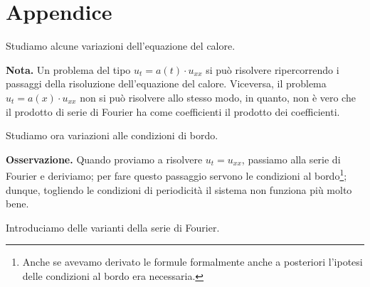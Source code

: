 \section{Appendice}

Studiamo alcune variazioni dell'equazione del calore.

\textbf{Nota.} Un problema del tipo $u_t = a(t) \cdot u_{xx}$ si può risolvere ripercorrendo i passaggi della risoluzione dell'equazione del calore.
Viceversa, il problema $u_t = a(x) \cdot u_{xx}$ non si può risolvere allo stesso modo, in quanto, non è vero che il prodotto di serie di Fourier ha come coefficienti il prodotto dei coefficienti.

Studiamo ora variazioni alle condizioni di bordo.

\textbf{Osservazione.} Quando proviamo a risolvere $u_t = u_{xx}$, passiamo alla serie di Fourier e deriviamo; per fare questo passaggio servono le condizioni al bordo\footnote{Anche se avevamo derivato le formule formalmente anche a posteriori l'ipotesi delle condizioni al bordo era necessaria.}; dunque, togliendo le condizioni di periodicità il sistema non funziona più molto bene.

Introduciamo delle varianti della serie di Fourier.

